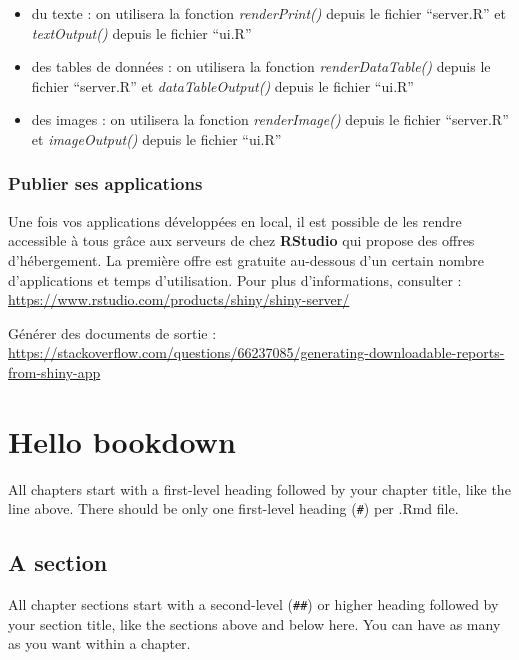 \documentclass[
]{book}
\providecommand{\tightlist}{%
  \setlength{\itemsep}{0pt}\setlength{\parskip}{0pt}}
\theoremstyle{definition}
\theoremstyle{definition}
\theoremstyle{definition}
\theoremstyle{definition}
\theoremstyle{remark}
\begin{document}
\begin{itemize}
\tightlist
\item
  du texte : on utilisera la fonction \emph{renderPrint()} depuis le fichier ``server.R'' et \emph{textOutput()} depuis le fichier ``ui.R''
\item
  des tables de données : on utilisera la fonction \emph{renderDataTable()} depuis le fichier ``server.R'' et \emph{dataTableOutput()} depuis le fichier ``ui.R''
\item
  des images : on utilisera la fonction \emph{renderImage()} depuis le fichier ``server.R'' et \emph{imageOutput()} depuis le fichier ``ui.R''
\end{itemize}

\hypertarget{publier-ses-applications}{%
\subsection{Publier ses applications}\label{publier-ses-applications}}

Une fois vos applications développées en local, il est possible de les rendre accessible à tous grâce aux serveurs de chez \textbf{RStudio} qui propose des offres d'hébergement. La première offre est gratuite au-dessous d'un certain nombre d'applications et temps d'utilisation. Pour plus d'informations, consulter : \url{https://www.rstudio.com/products/shiny/shiny-server/}

Générer des documents de sortie : \url{https://stackoverflow.com/questions/66237085/generating-downloadable-reports-from-shiny-app}

\hypertarget{hello-bookdown}{%
\chapter{Hello bookdown}\label{hello-bookdown}}

All chapters start with a first-level heading followed by your chapter title, like the line above. There should be only one first-level heading (\texttt{\#}) per .Rmd file.

\hypertarget{a-section}{%
\section{A section}\label{a-section}}

All chapter sections start with a second-level (\texttt{\#\#}) or higher heading followed by your section title, like the sections above and below here. You can have as many as you want within a chapter.
\end{document}
